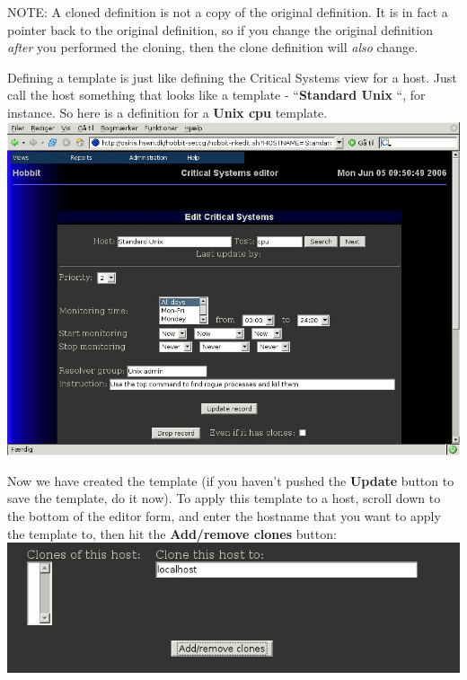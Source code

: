  NOTE: A cloned definition is not a copy of the original definition. It is in fact a pointer back to the original definition, so if you change the original definition \emph{after}
 you performed the cloning, then the clone definition will \emph{also}
 change.


 Defining a template is just like defining the Critical Systems view for a host. Just call the host something that looks like a template - ``\textbf{Standard Unix}
``, for instance. So here is a definition for a \textbf{Unix cpu}
 template.\\ 
\includegraphics[scale=1]{./editor-clonemaster.png} 


 Now we have created the template (if you haven't pushed the \textbf{Update}
 button to save the template, do it now). To apply this template to a host, scroll down to the bottom of the editor form, and enter the hostname that you want to apply the template to, then hit the \textbf{Add/remove clones}
 button:\\ 
\includegraphics[scale=1]{./editor-makeclone.png} 


